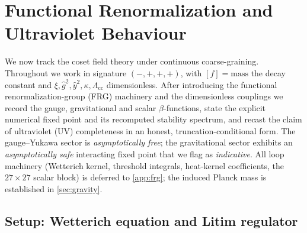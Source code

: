 \documentclass[11pt]{article}
\theoremstyle{plain}
\theoremstyle{definition}
\theoremstyle{remark}
\begin{document}
\section{Functional Renormalization and Ultraviolet Behaviour}
\label{sec:frg:main}

We now track the coset field theory under continuous coarse-graining.
Throughout we work in signature $(-,+,+,+)$, with $[f]=\text{mass}$ the
decay constant and $\xi,\hat g^{2},\hat y^{2},\kappa,\Lambda_{\mathrm{cc}}$
dimensionless. After introducing the functional renormalization-group
(FRG) machinery and the dimensionless couplings we record the gauge,
gravitational and scalar $\beta$-functions, state the explicit numerical
fixed point and its recomputed stability spectrum, and recast the claim of
ultraviolet (UV) completeness in an honest, truncation-conditional form.
The gauge--Yukawa sector is \emph{asymptotically free}; the gravitational
sector exhibits an \emph{asymptotically safe} interacting fixed point that
we flag as \emph{indicative}. All loop machinery (Wetterich kernel,
threshold integrals, heat-kernel coefficients, the $27\times27$ scalar
block) is deferred to \autoref{app:frg}; the induced Planck mass is
established in \autoref{sec:gravity}.

\subsection{Setup: Wetterich equation and Litim regulator}
\label{sec:frg:setup}
\end{document}
